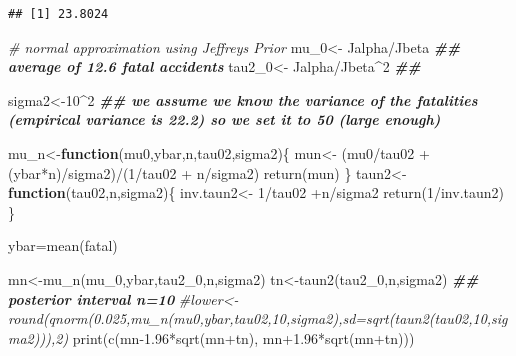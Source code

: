 \documentclass[
]{book}
\newenvironment{Shaded}{\begin{snugshade}}{\end{snugshade}}
\newcommand{\CommentTok}[1]{\textcolor[rgb]{0.56,0.35,0.01}{\textit{#1}}}
\newcommand{\ControlFlowTok}[1]{\textcolor[rgb]{0.13,0.29,0.53}{\textbf{#1}}}
\newcommand{\DecValTok}[1]{\textcolor[rgb]{0.00,0.00,0.81}{#1}}
\newcommand{\DocumentationTok}[1]{\textcolor[rgb]{0.56,0.35,0.01}{\textbf{\textit{#1}}}}
\newcommand{\FloatTok}[1]{\textcolor[rgb]{0.00,0.00,0.81}{#1}}
\newcommand{\FunctionTok}[1]{\textcolor[rgb]{0.00,0.00,0.00}{#1}}
\newcommand{\NormalTok}[1]{#1}
\newcommand{\OtherTok}[1]{\textcolor[rgb]{0.56,0.35,0.01}{#1}}
\newcommand{\SpecialCharTok}[1]{\textcolor[rgb]{0.00,0.00,0.00}{#1}}
\theoremstyle{definition}
\theoremstyle{definition}
\theoremstyle{definition}
\theoremstyle{definition}
\theoremstyle{remark}
\begin{document}
\begin{verbatim}
## [1] 23.8024
\end{verbatim}

\begin{Shaded}
\begin{Highlighting}[]
 \CommentTok{\# normal approximation using Jeffrey\textquotesingle{}s Prior}
\NormalTok{  mu\_0}\OtherTok{\textless{}{-}}\NormalTok{ Jalpha}\SpecialCharTok{/}\NormalTok{Jbeta  }\DocumentationTok{\#\# average of 12.6 fatal accidents}
\NormalTok{  tau2\_0}\OtherTok{\textless{}{-}}\NormalTok{ Jalpha}\SpecialCharTok{/}\NormalTok{Jbeta}\SpecialCharTok{\^{}}\DecValTok{2} \DocumentationTok{\#\# }
  
\NormalTok{  sigma2}\OtherTok{\textless{}{-}}\DecValTok{10}\SpecialCharTok{\^{}}\DecValTok{2}  \DocumentationTok{\#\# we assume we know the variance of the fatalities (empirical variance is 22.2) so we set it to 50 (large enough)}
  
  
\NormalTok{  mu\_n}\OtherTok{\textless{}{-}}\ControlFlowTok{function}\NormalTok{(mu0,ybar,n,tau02,sigma2)\{}
\NormalTok{  mun}\OtherTok{\textless{}{-}}\NormalTok{ (mu0}\SpecialCharTok{/}\NormalTok{tau02 }\SpecialCharTok{+}\NormalTok{ (ybar}\SpecialCharTok{*}\NormalTok{n)}\SpecialCharTok{/}\NormalTok{sigma2)}\SpecialCharTok{/}\NormalTok{(}\DecValTok{1}\SpecialCharTok{/}\NormalTok{tau02 }\SpecialCharTok{+}\NormalTok{ n}\SpecialCharTok{/}\NormalTok{sigma2)}
  \FunctionTok{return}\NormalTok{(mun)}
\NormalTok{\}}
\NormalTok{taun2}\OtherTok{\textless{}{-}}\ControlFlowTok{function}\NormalTok{(tau02,n,sigma2)\{}
\NormalTok{  inv.taun2}\OtherTok{\textless{}{-}} \DecValTok{1}\SpecialCharTok{/}\NormalTok{tau02 }\SpecialCharTok{+}\NormalTok{n}\SpecialCharTok{/}\NormalTok{sigma2}
  \FunctionTok{return}\NormalTok{(}\DecValTok{1}\SpecialCharTok{/}\NormalTok{inv.taun2)}
\NormalTok{\}}

\NormalTok{ybar}\OtherTok{=}\FunctionTok{mean}\NormalTok{(fatal)}

\NormalTok{ mn}\OtherTok{\textless{}{-}}\FunctionTok{mu\_n}\NormalTok{(mu\_0,ybar,tau2\_0,n,sigma2)}
\NormalTok{ tn}\OtherTok{\textless{}{-}}\FunctionTok{taun2}\NormalTok{(tau2\_0,n,sigma2)}
\DocumentationTok{\#\# posterior interval n=10}
  \CommentTok{\#lower\textless{}{-}round(qnorm(0.025,mu\_n(mu0,ybar,tau02,10,sigma2),sd=sqrt(taun2(tau02,10,sigma2))),2)}
  \FunctionTok{print}\NormalTok{(}\FunctionTok{c}\NormalTok{(mn}\FloatTok{{-}1.96}\SpecialCharTok{*}\FunctionTok{sqrt}\NormalTok{(mn}\SpecialCharTok{+}\NormalTok{tn), mn}\FloatTok{+1.96}\SpecialCharTok{*}\FunctionTok{sqrt}\NormalTok{(mn}\SpecialCharTok{+}\NormalTok{tn)))}
\end{Highlighting}
\end{Shaded}
\end{document}
